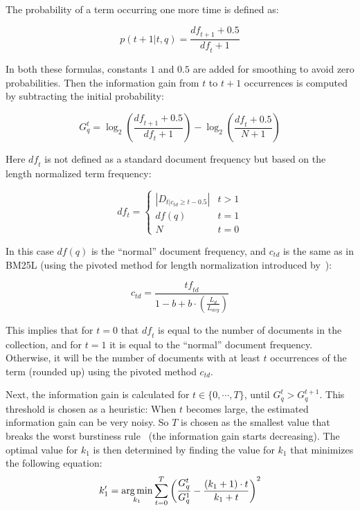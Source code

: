 The probability of a term occurring one more time is defined as:

\begin{equation}
	p(t+1|t,q) = \frac{\mathit{df}_{t+1}+0.5}{\mathit{df}_t+1}
\end{equation}

In both these formulas, constants $1$ and $0.5$ are added for smoothing to avoid zero probabilities. Then the information gain from $t$ to $t+1$ occurrences is computed by subtracting the initial probability: 

\begin{equation}
	G^t_q = \log_2\left(\frac{\mathit{df}_{t+1} + 0.5}{\mathit{df}_t+1}\right) - \log_2 \left(\frac{\mathit{df}_{t} + 0.5}{N+1}\right)
\end{equation}

Here $\mathit{df}_t$ is not defined as a standard document frequency but based on the length normalized term frequency:

\begin{equation}
	df_t = 
	\begin{cases}
		|D_{t|c_{td}\geq t-0.5}| & t > 1\\ 
		df(q) & t = 1\\
		N & t = 0
	\end{cases}
\end{equation}

In this case $\mathit{df}(q)$ is the ``normal'' document frequency, and $c_{\mathit{td}}$ is the same as in BM25L (using the pivoted method for length normalization introduced by~\citet{ctd}):

\begin{equation}
	c_{\mathit{td}} = \frac{\mathit{tf}_{\mathit{td}}}{1-b+b\cdot\left(\frac{L_d}{L_{\mathit{avg}}}\right)}
\end{equation}

This implies that for $t = 0$ that $\mathit{df}_t$ is equal to the number of documents in the collection, and for $t = 1$ it is equal to the ``normal'' document frequency. Otherwise, it will be the number of documents with at least $t$ occurrences of the term (rounded up) using the pivoted method $c_{\mathit{td}}$. 

Next, the information gain is calculated for $t \in \{0,\cdots,T\}$, until $G^t_q > G^{t+1}_q$. This threshold is chosen as a heuristic: When $t$ becomes large, the estimated information gain can be very noisy. So $T$ is chosen as the smallest value that breaks the worst burstiness rule~\citep{burstiness_rule} (the information gain starts decreasing). The optimal value for $k_1$ is then determined by finding the value for $k_1$ that minimizes the following equation:
\begin{equation}
	k'_1 = \operatorname*{arg\,min}_{k_1} \sum_{t=0}^{T}\left(\frac{G^t_q}{G^1_q} - \frac{(k_1+1)\cdot t}{k_1+t}\right)^2
\end{equation}

